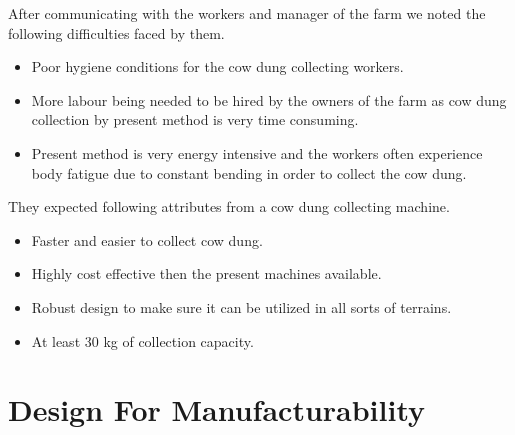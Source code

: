 \noindent After communicating with the workers and manager of the farm we noted the following difficulties faced by them.
\begin{itemize}
    \item Poor hygiene conditions for the cow dung collecting workers.
    
    \item More labour being needed to be hired by the owners of the farm as cow dung collection by present method is very time consuming.

     \item Present method is very energy intensive and the workers often experience body fatigue due to constant bending in order to collect the cow dung.
     
\end{itemize}

\noindent They expected following attributes from a cow dung collecting machine.

\begin{itemize}
    \item Faster and easier to collect cow dung.
    \item Highly cost effective then the present machines available.
    \item Robust design to make sure it can be utilized in all sorts of terrains.
    \item At least 30 kg of collection capacity.
    
\end{itemize}

\pagebreak





\section{Design For Manufacturability}

